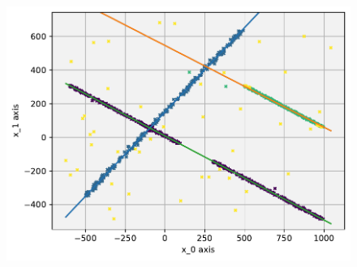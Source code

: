 \begin{figure}[h]
    \vspace{2mm}
    \includegraphics[width=.5\textwidth]{figure_method_grid/GlobalLinearCorrelationsWithCorrs.pdf}
    \label{fig:gclusterexample}
\end{figure}








